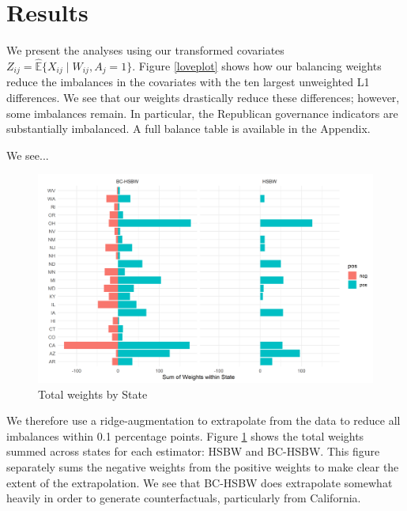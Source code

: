 \documentclass[12pt]{article}
\begin{document}
\section{Results}

We present the analyses using our transformed covariates $Z_{ij} = \hat{\mathbb{E}}\{X_{ij} \mid W_{ij}, A_j = 1\}$. Figure \ref{loveplot} shows how our balancing weights reduce the imbalances in the covariates with the ten largest unweighted L1 differences. We see that our weights drastically reduce these differences; however, some imbalances remain. In particular, the Republican governance indicators are substantially imbalanced. A full balance table is available in the Appendix. 

We see...

\begin{figure}[B]
\begin{center}
    \includegraphics[scale=0.6]{01_Plots/weights-by-state-main.png}
    \caption{Total weights by State}
    \label{statewghts}
\end{center}
\end{figure}

We therefore use a ridge-augmentation to extrapolate from the data to reduce all imbalances within 0.1 percentage points. Figure \ref{statewghts} shows the total weights summed across states for each estimator: HSBW and BC-HSBW. This figure separately sums the negative weights from the positive weights to make clear the extent of the extrapolation. We see that BC-HSBW does extrapolate somewhat heavily in order to generate counterfactuals, particularly from California. 
\end{document}

